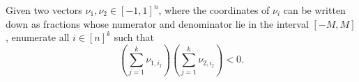 \begin{problem}
	Given two vectors $\nu_1, \nu_2 \in {[-1,1]}^n$, where the coordinates of
	$\nu_i$ can be written down as fractions whose numerator and denominator
	lie in the interval $[-M,M]$, enumerate all
	$i\in {[n]}^k$ such that
	$$
	\left(\sum_{j=1}^{k} \nu_{1,i_j}\right)
	\left(\sum_{j=1}^{k} \nu_{2,i_j}\right)
	< 0.
	$$
\end{problem}
